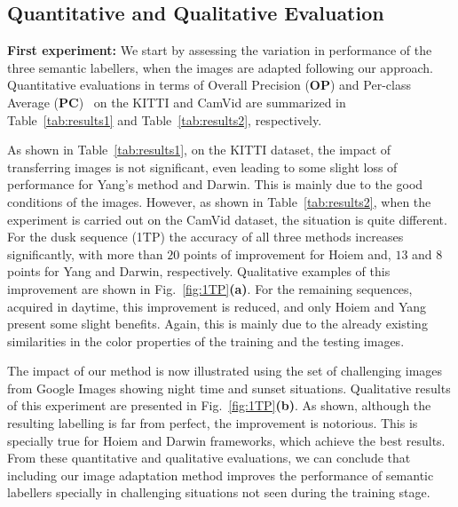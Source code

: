 
\subsection{Quantitative and Qualitative Evaluation}
\textbf{First experiment:} We start by assessing the variation in
performance of the three semantic labellers, when the images are
adapted following our approach. Quantitative evaluations in terms
of Overall Precision (\textbf{OP}) and Per-class Average
(\textbf{PC})~\cite{Ladicky:2013} on the KITTI and CamVid are summarized in
Table~\ref{tab:results1} and Table~\ref{tab:results2},
respectively.

As shown in Table~\ref{tab:results1}, on the KITTI dataset, the
impact of transferring images is not significant, even leading to
some slight loss of performance for Yang's method and Darwin. This
is mainly due to the good conditions of the images. However, as
shown in Table~\ref{tab:results2}, when the experiment is carried
out on the CamVid dataset, the situation is quite different. For
the dusk sequence (1TP) the accuracy of all three methods
increases significantly, with more than $20$ points of improvement
for Hoiem and, $13$ and $8$ points for Yang and Darwin,
respectively. Qualitative examples of this improvement are shown
in Fig.~\ref{fig:1TP}\textbf{(a)}. For the remaining sequences, acquired in
daytime, this improvement is reduced, and only Hoiem and Yang
present some slight benefits. Again, this is mainly due to the
already existing similarities in the color properties of the
training and the testing images.

The impact of our method is now illustrated using the set of
challenging images from Google Images showing night time and
sunset situations. Qualitative results of this experiment are
presented in Fig.~\ref{fig:1TP}\textbf{(b)}. As shown, although the
resulting labelling is far from perfect, the improvement is
notorious. This is specially true for Hoiem and Darwin frameworks,
which achieve the best results. From these quantitative and
qualitative evaluations, we can conclude that including our image
adaptation method improves the performance of semantic labellers
specially in challenging situations not seen during the training
stage.

